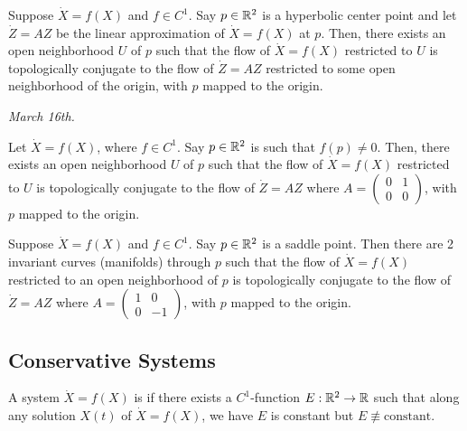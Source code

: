 \begin{theorem}
    Suppose $\dot{X} = f(X)$ and $f \in C^{1}$. Say $p \in \mathbb{R}^{2}$ is a hyperbolic center point and let $\dot{Z} = AZ$ be the linear approximation of $\dot{X} = f(X)$ at $p$. Then, there exists an open neighborhood $U$ of $p$ such that the flow of $\dot{X} = f(X)$ restricted to $U$ is topologically conjugate to the flow of $\dot{Z} = AZ$ restricted to some open neighborhood of the origin, with $p$ mapped to the origin.
\end{theorem}

\textit{March 16th.}

\begin{theorem}
    Let $\dot{X} = f(X)$, where $f \in C^{1}$. Say $p \in \mathbb{R}^{2}$ is such that $f(p) \neq 0$. Then, there exists an open neighborhood $U$ of $p$ such that the flow of $\dot{X} = f(X)$ restricted to $U$ is topologically conjugate to the flow of $\dot{Z} = AZ$ where $A = \begin{pmatrix}
        0 & 1 \\
        0 & 0
    \end{pmatrix}$, with $p$ mapped to the origin.
\end{theorem}

\begin{theorem}
    Suppose $\dot{X} = f(X)$ and $f \in C^{1}$. Say $p \in \mathbb{R}^{2}$ is a saddle point. Then there are 2 invariant curves (manifolds) through $p$ such that the flow of $\dot{X} = f(X)$ restricted to an open neighborhood of $p$ is topologically conjugate to the flow of $\dot{Z} = AZ$ where $A = \begin{pmatrix}
        1 & 0 \\
        0 & -1
    \end{pmatrix}$, with $p$ mapped to the origin.
\end{theorem}

\subsection{Conservative Systems}

\begin{definition}
    A system $\dot{X} = f(X)$ is  if there exists a $C^{1}$-function $E:\mathbb{R}^{2} \to \mathbb{R}$ such that along any solution $X(t)$ of $\dot{X} = f(X)$, we have $E$ is constant but $E \not\equiv \text{constant}$.
\end{definition}

